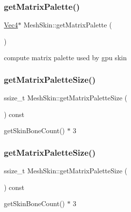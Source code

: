 \subsubsection{\texorpdfstring{get\+Matrix\+Palette()}{getMatrixPalette()}\hspace{0.1cm}{\footnotesize\ttfamily [2/2]}}
{\footnotesize\ttfamily \hyperlink{classVec4}{Vec4}$\ast$ Mesh\+Skin\+::get\+Matrix\+Palette (\begin{DoxyParamCaption}{ }\end{DoxyParamCaption})}

compute matrix palette used by gpu skin \mbox{\label{classMeshSkin_a34c91f249fdec320a2a3243ce7a184c9}} 
\subsubsection{\texorpdfstring{get\+Matrix\+Palette\+Size()}{getMatrixPaletteSize()}\hspace{0.1cm}{\footnotesize\ttfamily [1/2]}}
{\footnotesize\ttfamily ssize\+\_\+t Mesh\+Skin\+::get\+Matrix\+Palette\+Size (\begin{DoxyParamCaption}{ }\end{DoxyParamCaption}) const}

get\+Skin\+Bone\+Count() $\ast$ 3 \mbox{\label{classMeshSkin_a34c91f249fdec320a2a3243ce7a184c9}} 
\subsubsection{\texorpdfstring{get\+Matrix\+Palette\+Size()}{getMatrixPaletteSize()}\hspace{0.1cm}{\footnotesize\ttfamily [2/2]}}
{\footnotesize\ttfamily ssize\+\_\+t Mesh\+Skin\+::get\+Matrix\+Palette\+Size (\begin{DoxyParamCaption}{ }\end{DoxyParamCaption}) const}

get\+Skin\+Bone\+Count() $\ast$ 3 \mbox{\label{classMeshSkin_a724b98e3bd3ea369e2fa4cc56e9ef1b0}} 
